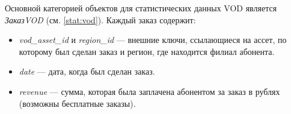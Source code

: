 Основной категорией объектов для статистических данных VOD является \textit{ЗаказVOD} (см. \ref{stat:vod}).
Каждый заказ содержит:
\begin{itemize}
\item{
  \textit{vod\_asset\_id} и \textit{region\_id} --- внешние ключи, ссылающиеся на ассет, по которому был сделан
заказ и регион, где находится филиал абонента.
}
\item{
  \textit{date} --- дата, когда был сделан заказ.
}
\item{
  \textit{revenue} --- сумма, которая была заплачена абонентом за заказ в рублях (возможны бесплатные заказы).
}
\end{itemize}
